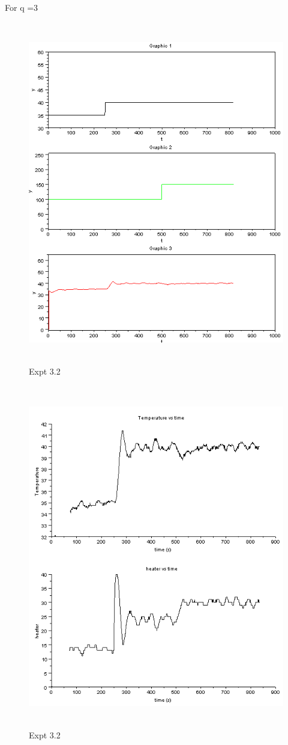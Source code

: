 For q =3
\begin{figure}[H]
  \includegraphics[width=12cm, height=15cm]{mpc/3_2.PNG}
  \caption{Expt 3.2}
\end{figure}
\begin{figure}[H]
  \includegraphics[width=12cm, height=15cm]{mpc/3_2_heater_final.png}
  \caption{Expt 3.2}
\end{figure}


